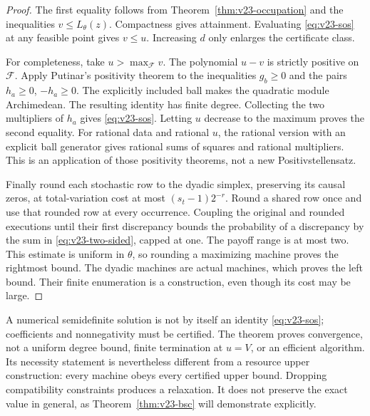 \begin{proof}
The first equality follows from Theorem~\ref{thm:v23-occupation} and
the inequalities $v\le L_\theta(z)$. Compactness gives attainment.
Evaluating \eqref{eq:v23-sos} at any feasible point gives $v\le u$.
Increasing $d$ only enlarges the certificate class.

For completeness, take $u>\max_{\mathcal F}v$. The polynomial $u-v$
is strictly positive on $\mathcal F$. Apply Putinar's positivity theorem
\cite{Putinar1993} to the inequalities $g_b\ge0$ and the pairs
$h_a\ge0$, $-h_a\ge0$. The explicitly included ball makes the quadratic
module Archimedean. The resulting identity has finite degree. Collecting
the two multipliers of $h_a$ gives \eqref{eq:v23-sos}. Letting $u$
decrease to the maximum proves the second equality. For rational data
and rational $u$, the rational version with an explicit ball generator
\cite[Theorem 6]{Powers2009} gives rational sums of squares and rational
multipliers. This is an application of those positivity theorems, not a
new Positivstellensatz.

Finally round each stochastic row to the dyadic simplex, preserving its
causal zeros, at total-variation cost at most $(s_t-1)2^{-r}$. Round a
shared row once and use that rounded row at every occurrence. Coupling
the original and rounded executions until their first discrepancy bounds
the probability of a discrepancy by the sum in
\eqref{eq:v23-two-sided}, capped at one. The payoff range is at most
two. This estimate is uniform in $\theta$, so rounding a maximizing
machine proves the rightmost bound. The dyadic machines are actual
machines, which proves the left bound. Their finite enumeration is a
construction, even though its cost may be large.
\end{proof}

A numerical semidefinite solution is not by itself an identity
\eqref{eq:v23-sos}; coefficients and nonnegativity must be certified.
The theorem proves convergence, not a uniform degree bound, finite
termination at $u=V$, or an efficient algorithm. Its necessity statement
is nevertheless different from a resource upper construction: every
machine obeys every certified upper bound. Dropping compatibility
constraints produces a relaxation. It does not preserve the exact value
in general, as Theorem~\ref{thm:v23-bsc} will demonstrate explicitly.

